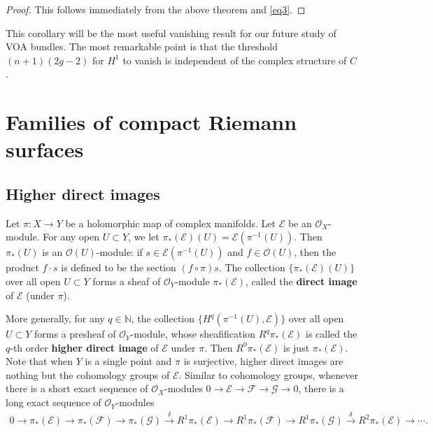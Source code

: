 \documentclass[12pt,b5paper,notitlepage]{report}
\theoremstyle{definition}
\theoremstyle{plain}
\newcommand{\scr}{\mathscr}
\numberwithin{equation}{section}
\begin{document}
\begin{proof}
This follows immediately from the above theorem and \eqref{eq3}.
\end{proof}

This corollary will be the most useful vanishing result for our future study of VOA bundles. The most remarkable point   is that  the threshold $(n+1)(2g-2)$ for $H^1$ to vanish  is independent of the complex structure of $C$.


\section{Families of compact Riemann surfaces}\label{lb1}


\subsection*{Higher direct images}

Let $\pi:X\rightarrow Y$ be a holomorphic map of complex manifolds. Let $\scr E$ be an $\scr O_{X}$-module. For any open $ U\subset Y$, we let $\pi_*(\scr E)( U)=\scr E(\pi^{-1}( U))$. Then $\pi_*( U)$ is an $\scr O( U)$-module: if $s\in\scr E(\pi^{-1}( U))$ and $f\in\scr O( U)$, then the product $f\cdot s$ is defined to be the section $(f\circ\pi)s$. The collection $\{\pi_*(\scr E)( U)\}$ over all open $ U\subset Y$ forms a sheaf of $\scr O_{Y}$-module $\pi_*(\scr E)$, called the \textbf{direct image} of $\scr E$ (under $\pi$). 

More generally, for any $q\in\mathbb N$, the collection $\{H^q(\pi^{-1}( U),\scr E)\}$ over all open $ U\subset Y$ forms a presheaf of $\scr O_{Y}$-module, whose sheafification $R^q\pi_*(\scr E)$ \index{Rq@$R^q\pi_*(\scr E)$, $\pi_*(\scr E)$} is called the $q$-th order \textbf{higher direct image} of $\scr E$ under $\pi$. Then $R^0\pi_*(\scr E)$ is just $\pi_*(\scr E)$.  Note that when $Y$ is a single point and $\pi$ is surjective, higher direct images are nothing but the cohomology groups of $\scr E$. Similar to cohomology groups, whenever there is a short exact sequence of $\scr O_{X}$-modules $0\rightarrow\scr E\rightarrow\scr F\rightarrow\scr G\rightarrow 0$, there is a long exact sequence of $\scr O_{Y}$-modules
\begin{align}
0\rightarrow \pi_*(\scr E)\rightarrow\pi_*(\scr F)\rightarrow\pi_*(\scr G)\xrightarrow{\delta} R^1\pi_*(\scr E)\rightarrow R^1\pi_*(\scr F)\rightarrow R^1\pi_*(\scr G)\xrightarrow{\delta} R^2\pi_*(\scr E)\rightarrow\cdots.\label{eq4}
\end{align}
\end{document}
